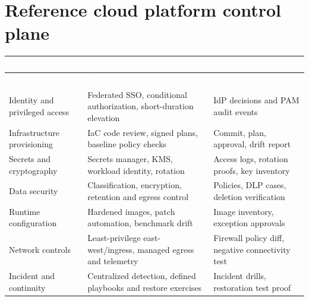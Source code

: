 \documentclass[11pt,letterpaper]{article}
\begin{document}
\section{Reference cloud platform control plane}
\small{}\begin{longtable}{>{\raggedright\arraybackslash}p{}>{\raggedright\arraybackslash}p{}>{\raggedright\arraybackslash}p{}}
\rowcolor{navy} \textcolor{white}{\textbf{Control plane}} & \textcolor{white}{\textbf{Engineering capability}} & \textcolor{white}{\textbf{Suggested evidence}}\\
\endfirsthead
\rowcolor{navy} \textcolor{white}{\textbf{Control plane}} & \textcolor{white}{\textbf{Engineering capability}} & \textcolor{white}{\textbf{Suggested evidence}}\\
\endhead
Identity and privileged access & Federated SSO, conditional authorization, short-duration elevation & IdP decisions and PAM audit events\\
Infrastructure provisioning & IaC code review, signed plans, baseline policy checks & Commit, plan, approval, drift report\\
Secrets and cryptography & Secrets manager, KMS, workload identity, rotation & Access logs, rotation proofs, key inventory\\
Data security & Classification, encryption, retention and egress control & Policies, DLP cases, deletion verification\\
Runtime configuration & Hardened images, patch automation, benchmark drift & Image inventory, exception approvals\\
Network controls & Least-privilege east-west/ingress, managed egress and telemetry & Firewall policy diff, negative connectivity test\\
Incident and continuity & Centralized detection, defined playbooks and restore exercises & Incident drills, restoration test proof\\
\end{longtable}\normalsize
\end{document}
